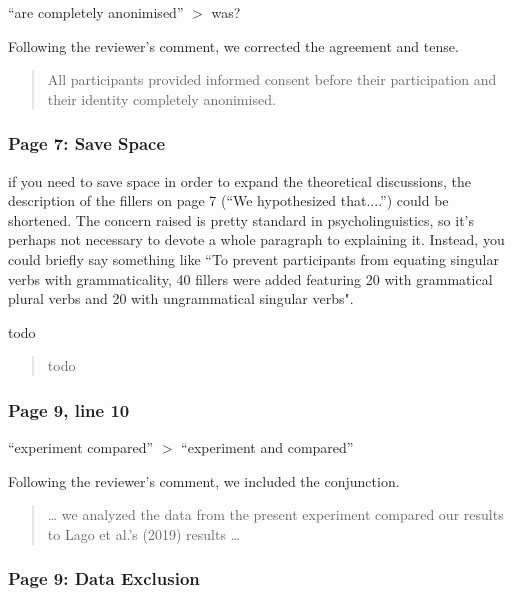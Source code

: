 \documentclass{ar2rc}
\begin{document}
\RC ``are completely anonimised'' $>$ was?

\AR Following the reviewer's comment, we corrected the agreement and tense.

\begin{quote}
    All participants provided informed consent before their participation and their identity \DIFaddbegin {} \DIFaddend \DIFdelbegin {} \DIFdelend{} completely anonimised. 
\end{quote}

\subsubsection{Page 7: Save Space}

\RC if you need to save space in order to expand the theoretical discussions, the description of the fillers on page 7 (``We hypothesized that....'') could be shortened. The concern raised is pretty standard in psycholinguistics, so it's perhaps not necessary to devote a whole paragraph to explaining it. Instead, you could briefly say something like ``To prevent participants from equating singular verbs with grammaticality, 40 fillers were added featuring 20 with grammatical plural verbs and 20 with ungrammatical singular verbs".

\AC todo

\begin{quote}
    todo 
\end{quote}


\subsubsection{Page 9, line 10}

\RC ``experiment compared'' $>$ ``experiment and compared''

\AC Following the reviewer's comment, we included the conjunction.

\begin{quote}
    \ldots{} we analyzed the data from the present experiment  \DIFaddbegin {} \DIFaddend compared our results to Lago et al.'s (2019) results \ldots
\end{quote}

\subsubsection{Page 9: Data Exclusion}
\end{document}
